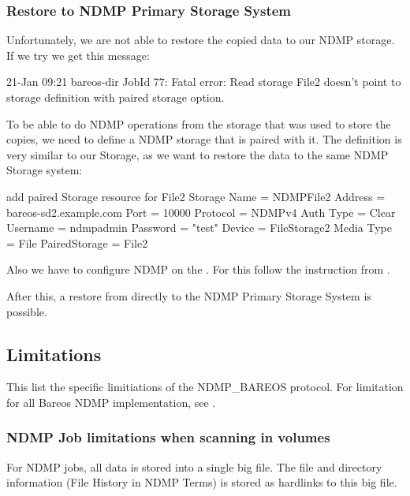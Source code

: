 \subsubsection{Restore to NDMP Primary Storage System}

Unfortunately, we are not able to restore the copied data to our NDMP storage. If we try we get this message:

\begin{bmessage}{}
21-Jan 09:21 bareos-dir JobId 77: Fatal error: Read storage File2 doesn't point to storage definition with paired storage option.
\end{bmessage}

To be able to do NDMP operations from the storage that was used to store the copies,
we need to define a NDMP storage that is paired with it.
The definition is very similar to our  Storage,
as we want to restore the data to the same NDMP Storage system:

\begin{bconfig}{add paired Storage resource for File2}
Storage {
  Name = NDMPFile2
  Address = bareos-sd2.example.com
  Port = 10000
  Protocol = NDMPv4
  Auth Type = Clear
  Username = ndmpadmin
  Password = "test"
  Device = FileStorage2
  Media Type = File
  PairedStorage = File2
}
\end{bconfig}

Also we have to configure NDMP on the \bareosSd {}.
For this follow the instruction from .

After this, a restore from  directly to the NDMP Primary Storage System is possible.



\subsection{Limitations}

This list the specific limitiations of the NDMP\_BAREOS protocol.
For limitation for all Bareos NDMP implementation, see .

\subsubsection{NDMP Job limitations when scanning in volumes}
\label{sec:ndmp-filehistory}

For NDMP jobs, all data is stored into a single big file. The file and directory information (File History in NDMP Terms) is stored as hardlinks to this big file.

